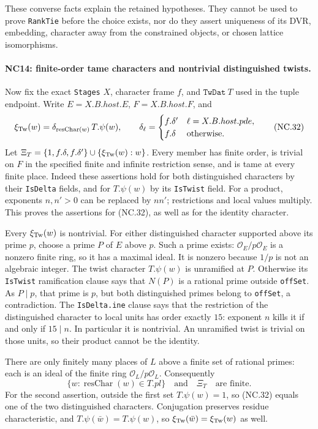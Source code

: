 These converse facts explain the retained hypotheses.
They cannot be used to prove \texttt{RankTie} before the
choice exists, nor do they assert uniqueness of its DVR,
embedding, character away from the constrained objects,
or chosen lattice isomorphisms.

\paragraph{NC14: finite-order tame characters and nontrivial distinguished twists.}
Now fix the exact \texttt{Stages} \(X\), character frame \(f\),
and \(\texttt{TwDat}\ T\) used in the tuple endpoint.
Write \(E=X.B.host.E\), \(F=X.B.host.F\), and
\[
 \xi_{\rm Tw}(w)
  =\delta_{\operatorname{resChar}(w)}\,T.\psi(w),\qquad
 \delta_\ell=
 \begin{cases}f.\delta'&\ell=X.B.host.pde,\\
               f.\delta&\text{otherwise}.
 \end{cases}
 \tag{NC.32}
\]
Let
\(\Xi_T=\{1,f.\delta,f.\delta'\}\cup
              \{\xi_{\rm Tw}(w):w\}\).
Every member has finite order, is trivial on \(F\) in the
specified finite and infinite restriction sense, and is
tame at every finite place.
Indeed these assertions hold for both distinguished
characters by their \texttt{IsDelta} fields, and for
\(T.\psi(w)\) by its \texttt{IsTwist} field.
For a product, exponents \(n,n'>0\) can be replaced by
\(nn'\); restrictions and local values multiply.
This proves the assertions for (NC.32), as well as for
the identity character.

Every \(\xi_{\rm Tw}(w)\) is nontrivial.
For either distinguished character supported above its
prime \(p\), choose a prime \(P\) of \(E\) above \(p\).
Such a prime exists: \(\mathcal O_E/p\mathcal O_E\) is a
nonzero finite ring, so it has a maximal ideal.
It is nonzero because \(1/p\) is not an algebraic integer.
The twist character \(T.\psi(w)\) is unramified at \(P\).
Otherwise its \texttt{IsTwist} ramification clause says
that \(N(P)\) is a rational prime outside \texttt{offSet}.
As \(P\mid p\), that prime is \(p\), but both distinguished
primes belong to \texttt{offSet}, a contradiction.
The \texttt{IsDelta.ine} clause says that the restriction
of the distinguished character to local units has order
exactly \(15\): exponent \(n\) kills it if and only if
\(15\mid n\). In particular it is nontrivial.
An unramified twist is trivial on those units, so their
product cannot be the identity.

There are only finitely many places of \(L\) above a finite
set of rational primes: each is an ideal of the finite ring
\(\mathcal O_L/p\mathcal O_L\).
Consequently
\[
 \{w:\operatorname{resChar}(w)\in T.pl\}
 \quad\text{and}\quad \Xi_T
 \quad\text{are finite}.
 \tag{NC.33}
\]
For the second assertion, outside the first set
\(T.\psi(w)=1\), so (NC.32) equals one of the two
distinguished characters. Conjugation preserves residue
characteristic, and \(T.\psi(\bar w)=T.\psi(w)\), so
\(\xi_{\rm Tw}(\bar w)=\xi_{\rm Tw}(w)\) as well.

